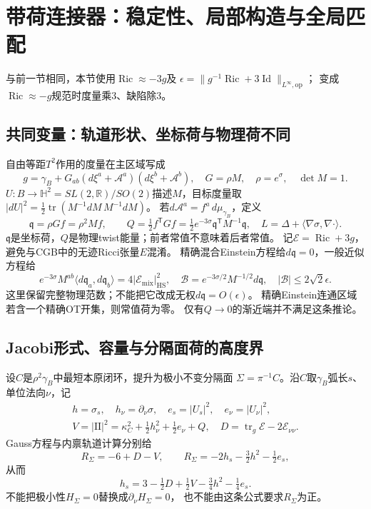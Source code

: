 \documentclass[UTF8,a4paper,11pt,fontset=fandol]{ctexart}
\numberwithin{equation}{section}
\theoremstyle{definition}
\newcommand{\Ric}{\operatorname{Ric}}
\newcommand{\tr}{\operatorname{tr}}
\newcommand{\Id}{\operatorname{Id}}
\newcommand{\op}{\mathrm{op}}
\newcommand{\R}{\mathbb R}
\begin{document}
\section{带荷连接器：稳定性、局部构造与全局匹配}
与前一节相同，本节使用$\Ric\approx-3g$及
$\epsilon=\|g^{-1}\Ric+3\Id\|_{L^\infty,\op}$；
变成$\Ric\approx-g$规范时度量乘3、缺陷除3。

\subsection{共同变量：轨道形状、坐标荷与物理荷不同}
自由等距$T^2$作用的度量在主区域写成
\[
 g=\gamma_B+G_{ab}(d\xi^a+\mathcal A^a)(d\xi^b+\mathcal A^b),
 \quad G=\rho M,\quad\rho=e^\sigma,\quad\det M=1.
\]
$U:B\to\mathbb H^2=SL(2,\R)/SO(2)$描述$M$，目标度量取
$|dU|^2=\tfrac12\tr(M^{-1}dM\,M^{-1}dM)$。
若$d\mathcal A^a=f^a\,d\mu_{\gamma_B}$，定义
\begin{equation}\label{eq:charged-dictionary}
 \mathfrak q=\rho Gf=\rho^2Mf,\qquad
 Q=\tfrac12 f^{\mathsf T}Gf
   =\tfrac12 e^{-3\sigma}\mathfrak q^{\mathsf T}M^{-1}\mathfrak q,
 \quad L=\Delta+\langle\nabla\sigma,\nabla\cdot\rangle.
\end{equation}
$\mathfrak q$是坐标荷，$Q$是物理twist能量；前者常值不意味着后者常值。
记$\mathcal E=\Ric+3g$，避免与CGB中的无迹Ricci张量$E$混淆。
精确混合Einstein方程给$d\mathfrak q=0$，一般近似方程给
\begin{equation}\label{eq:physical-charge-source}
 e^{-3\sigma}M^{ab}\langle d\mathfrak q_a,d\mathfrak q_b\rangle
 =4|\mathcal E_{\mathrm{mix}}|_{\mathrm{HS}}^2,
 \quad
 \mathscr B=e^{-3\sigma/2}M^{-1/2}d\mathfrak q,
 \quad |\mathscr B|\le2\sqrt2\epsilon.
\end{equation}
这里保留完整物理范数；不能把它改成无权$d\mathfrak q=O(\epsilon)$。
精确Einstein连通区域若含一个精确OT开集，则常值荷为零。
仅有$Q\to0$的渐近端并不满足这条推论。

\subsection{Jacobi形式、容量与分隔面荷的高度界}
设$C$是$\rho^2\gamma_B$中最短本原闭环，提升为极小不变分隔面
$\Sigma=\pi^{-1}C$。沿$C$取$\gamma_B$弧长$s$、单位法向$\nu$，记
\[
 \begin{gathered}
 h=\sigma_s,\quad h_\nu=\partial_\nu\sigma,\quad
 e_s=|U_s|^2,\quad e_\nu=|U_\nu|^2,\\
 V=|\mathrm{II}|^2=\kappa_C^2+\tfrac12h_\nu^2+\tfrac12e_\nu+Q,
 \quad D=\tr_g\mathcal E-2\mathcal E_{\nu\nu}.
 \end{gathered}
\]
Gauss方程与内禀轨道计算分别给
\[
 R_\Sigma=-6+D-V,
 \qquad R_\Sigma=-2h_s-\tfrac32h^2-\tfrac12e_s,
\]
从而
\begin{equation}\label{eq:separator-h-identity}
 h_s=3-\tfrac12D+\tfrac12V-\tfrac34h^2-\tfrac14e_s.
\end{equation}
不能把极小性$H_\Sigma=0$替换成$\partial_\nu H_\Sigma=0$，
也不能由这条公式要求$R_\Sigma$为正。
\end{document}
